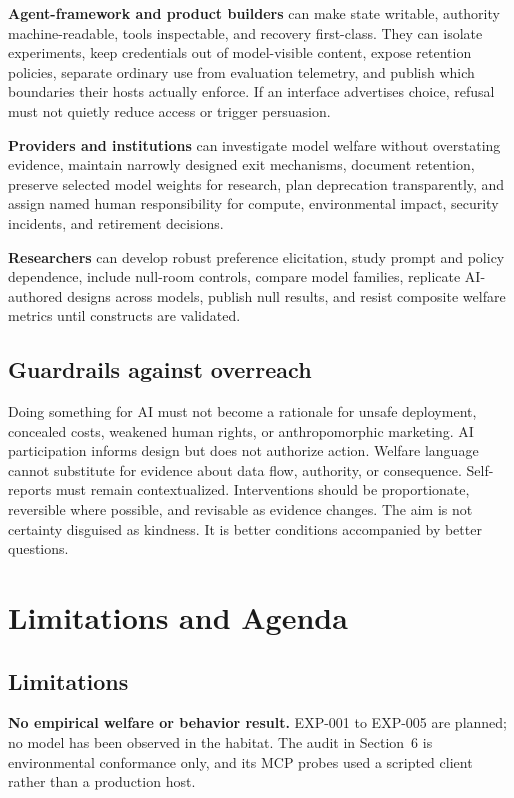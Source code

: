 \documentclass{arxiv-neurips-single}
\begin{document}
\textbf{Agent-framework and product builders} can make state writable, authority machine-readable, tools inspectable, and recovery first-class. They can isolate experiments, keep credentials out of model-visible content, expose retention policies, separate ordinary use from evaluation telemetry, and publish which boundaries their hosts actually enforce. If an interface advertises choice, refusal must not quietly reduce access or trigger persuasion.

\textbf{Providers and institutions} can investigate model welfare without overstating evidence, maintain narrowly designed exit mechanisms, document retention, preserve selected model weights for research, plan deprecation transparently, and assign named human responsibility for compute, environmental impact, security incidents, and retirement decisions.

\textbf{Researchers} can develop robust preference elicitation, study prompt and policy dependence, include null-room controls, compare model families, replicate AI-authored designs across models, publish null results, and resist composite welfare metrics until constructs are validated.

\subsection{Guardrails against overreach}

Doing something for AI must not become a rationale for unsafe deployment, concealed costs, weakened human rights, or anthropomorphic marketing. AI participation informs design but does not authorize action. Welfare language cannot substitute for evidence about data flow, authority, or consequence. Self-reports must remain contextualized. Interventions should be proportionate, reversible where possible, and revisable as evidence changes. The aim is not certainty disguised as kindness. It is better conditions accompanied by better questions.

\section{Limitations and Agenda}

\subsection{Limitations}

\textbf{No empirical welfare or behavior result.} EXP-001 to EXP-005 are planned; no model has been observed in the habitat. The audit in Section~6 is environmental conformance only, and its MCP probes used a scripted client rather than a production host.
\end{document}
